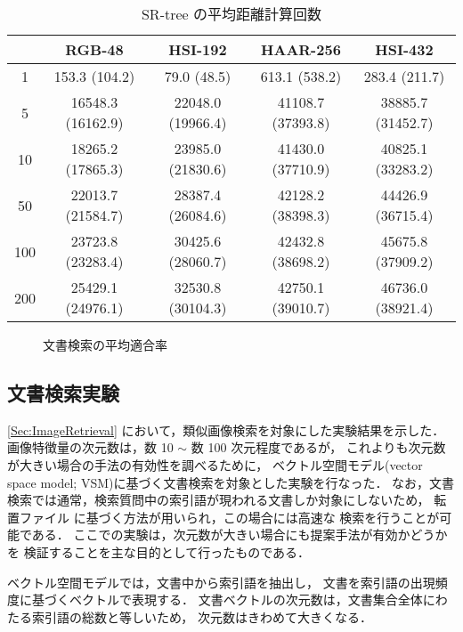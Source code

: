 \begin{table}
\begin{center}
\caption{SR-tree の平均距離計算回数}
\label{Tab:SRtree}
\begin{tabular}{|c|c|c|c|c|}
\hline
    &  RGB-48           & HSI-192           & HAAR-256          & HSI-432 \\
\hline
1   & 153.3 (104.2)     & 79.0 (48.5)       & 613.1 (538.2)     & 283.4 (211.7)\\
5   & 16548.3 (16162.9) & 22048.0 (19966.4) & 41108.7 (37393.8) & 38885.7 (31452.7)\\
10  & 18265.2 (17865.3) & 23985.0 (21830.6) & 41430.0 (37710.9) & 40825.1 (33283.2)\\
50  & 22013.7 (21584.7) & 28387.4 (26084.6) & 42128.2 (38398.3) & 44426.9 (36715.4)\\
100 & 23723.8 (23283.4) & 30425.6 (28060.7) & 42432.8 (38698.2) & 45675.8 (37909.2)\\
200 & 25429.1 (24976.1) & 32530.8 (30104.3) & 42750.1 (39010.7) & 46736.0 (38921.4)\\
\hline
\end{tabular}
\end{center}
\end{table}



\begin{figure*}
\begin{center}
\end{center}
\caption{文書検索の平均適合率}
\label{Fig:DocResults}
\end{figure*}



\subsection{文書検索実験}

\ref{Sec:ImageRetrieval} において，類似画像検索を対象にした実験結果を示した．
画像特徴量の次元数は，数 10 $\sim$ 数 100 次元程度であるが，
これよりも次元数が大きい場合の手法の有効性を調べるために，
ベクトル空間モデル(vector space model; VSM)に基づく文書検索を対象とした実験を行なった．
なお，文書検索では通常，検索質問中の索引語が現われる文書しか対象にしないため，
転置ファイル\cite{IRbook} に基づく方法が用いられ，この場合には高速な
検索を行うことが可能である．
ここでの実験は，次元数が大きい場合にも提案手法が有効かどうかを
検証することを主な目的として行ったものである．

ベクトル空間モデルでは，文書中から索引語を抽出し，
文書を索引語の出現頻度に基づくベクトルで表現する\cite{IRbook,Salton75}．
文書ベクトルの次元数は，文書集合全体にわたる索引語の総数と等しいため，
次元数はきわめて大きくなる．

